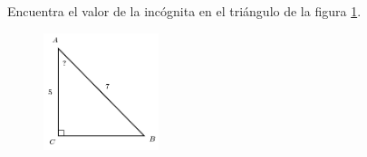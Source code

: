 \question[15]  Encuentra el valor de la incógnita en el triángulo de la figura \ref{fig:angle_functrig_19}.
\begin{figure}[H]
    \begin{center}
        \includegraphics[width=0.3\textwidth]{../images/angle_functrig_19.png}
    \end{center}
    \caption{}
    \label{fig:angle_functrig_19}
\end{figure}